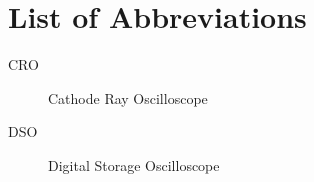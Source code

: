 \chapter*{List of Abbreviations}
    
    \begin{description}
    	\item[CRO] Cathode Ray Oscilloscope
    	\item[DSO] Digital Storage Oscilloscope
    \end{description}